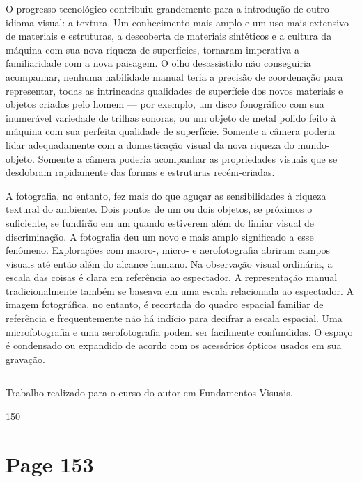\documentclass[a4paper]{article}
\begin{document}
\par
O progresso tecnológico contribuiu grandemente para a introdução de outro idioma visual: a textura. Um conhecimento mais amplo e um uso mais extensivo de materiais e estruturas, a descoberta de materiais sintéticos e a cultura da máquina com sua nova riqueza de superfícies, tornaram imperativa a familiaridade com a nova paisagem. O olho desassistido não conseguiria acompanhar, nenhuma habilidade manual teria a precisão de coordenação para representar, todas as intrincadas qualidades de superfície dos novos materiais e objetos criados pelo homem --- por exemplo, um disco fonográfico com sua inumerável variedade de trilhas sonoras, ou um objeto de metal polido feito à máquina com sua perfeita qualidade de superfície. Somente a câmera poderia lidar adequadamente com a domesticação visual da nova riqueza do mundo-objeto. Somente a câmera poderia acompanhar as propriedades visuais que se desdobram rapidamente das formas e estruturas recém-criadas.

\par
A fotografia, no entanto, fez mais do que aguçar as sensibilidades à riqueza textural do ambiente. Dois pontos de um ou dois objetos, se próximos o suficiente, se fundirão em um quando estiverem além do limiar visual de discriminação. A fotografia deu um novo e mais amplo significado a esse fenômeno. Explorações com macro-, micro- e aerofotografia abriram campos visuais até então além do alcance humano. Na observação visual ordinária, a escala das coisas é clara em referência ao espectador. A representação manual tradicionalmente também se baseava em uma escala relacionada ao espectador. A imagem fotográfica, no entanto, é recortada do quadro espacial familiar de referência e frequentemente não há indício para decifrar a escala espacial. Uma microfotografia e uma aerofotografia podem ser facilmente confundidas. O espaço é condensado ou expandido de acordo com os acessórios ópticos usados em sua gravação.

\vspace{3em} 
\noindent\rule{\textwidth}{0.4pt} 

\vspace{0.5em} 

\par\noindent
\small{\textbullet Trabalho realizado para o curso do autor em Fundamentos Visuais.}

\par\noindent
\small{150}

\newpage
\section*{Page 153}
\end{document}
